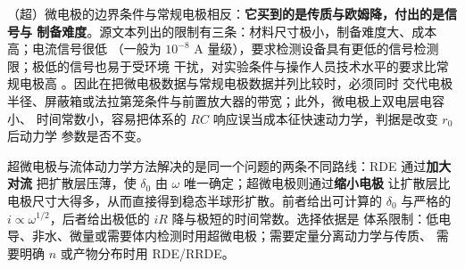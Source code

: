 \begin{pitfall}
（超）微电极的边界条件与常规电极相反：\textbf{它买到的是传质与欧姆降，付出的是信号与
制备难度}。源文本列出的限制有三条：材料尺寸极小，制备难度大、成本高；电流信号很低
（一般为 $10^{-8}$ A 量级），要求检测设备具有更低的信号检测限；极低的信号也易于受环境
干扰，对实验条件与操作人员技术水平的要求比常规电极高
。因此在把微电极数据与常规电极数据并列比较时，必须同时
交代电极半径、屏蔽箱或法拉第笼条件与前置放大器的带宽；此外，微电极上双电层电容小、
时间常数小，容易把体系的 $RC$ 响应误当成本征快速动力学，判据是改变 $r_0$ 后动力学
参数是否不变。
\end{pitfall}

\begin{crosscheck}
超微电极与流体动力学方法解决的是同一个问题的两条不同路线：RDE 通过\textbf{加大对流}
把扩散层压薄，使 $\delta_0$ 由 $\omega$ 唯一确定；超微电极则通过\textbf{缩小电极}
让扩散层比电极尺寸大得多，从而直接得到稳态半球形扩散。前者给出可计算的 $\delta_0$
与严格的 $i\propto\omega^{1/2}$，后者给出极低的 $iR$ 降与极短的时间常数。选择依据是
体系限制：低电导、非水、微量或需要体内检测时用超微电极；需要定量分离动力学与传质、
需要明确 $n$ 或产物分布时用 RDE/RRDE。
\end{crosscheck}

